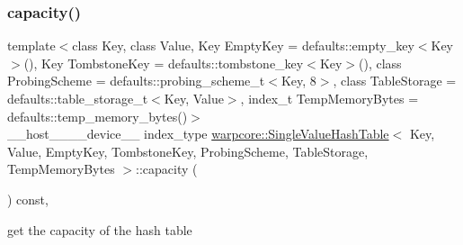 \subsubsection{\texorpdfstring{capacity()}{capacity()}}
{\footnotesize\ttfamily template$<$class Key, class Value, Key Empty\+Key = defaults\+::empty\+\_\+key$<$\+Key$>$(), Key Tombstone\+Key = defaults\+::tombstone\+\_\+key$<$\+Key$>$(), class Probing\+Scheme = defaults\+::probing\+\_\+scheme\+\_\+t$<$\+Key, 8$>$, class Table\+Storage = defaults\+::table\+\_\+storage\+\_\+t$<$\+Key, Value$>$, index\+\_\+t Temp\+Memory\+Bytes = defaults\+::temp\+\_\+memory\+\_\+bytes()$>$ \\
\+\_\+\+\_\+host\+\_\+\+\_\+\+\_\+\+\_\+device\+\_\+\+\_\+ index\+\_\+type \hyperlink{classwarpcore_1_1SingleValueHashTable}{warpcore\+::\+Single\+Value\+Hash\+Table}$<$ Key, Value, Empty\+Key, Tombstone\+Key, Probing\+Scheme, Table\+Storage, Temp\+Memory\+Bytes $>$\+::capacity (\begin{DoxyParamCaption}{ }\end{DoxyParamCaption}) const\hspace{0.3cm}{\ttfamily [inline]}, {\ttfamily [noexcept]}}



get the capacity of the hash table 

